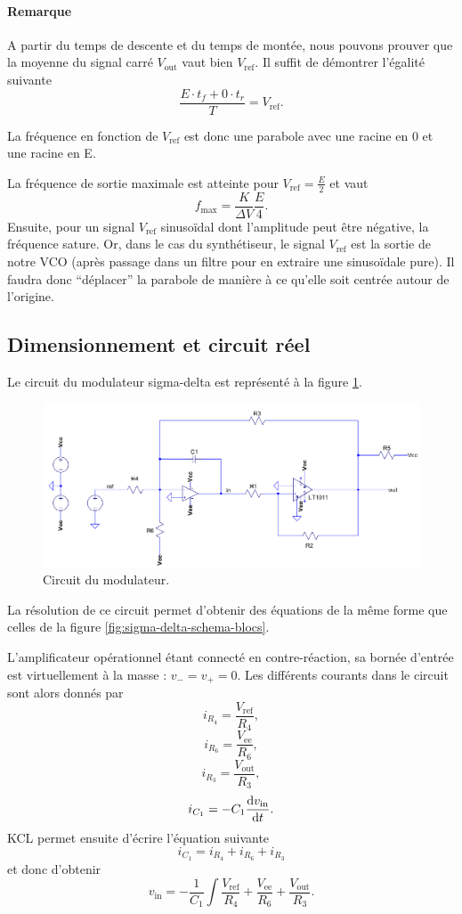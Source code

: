 \paragraph{Remarque}
A partir du temps de descente et du temps de montée, nous
pouvons prouver que la moyenne du signal carré $V_{\text{out}}$
vaut bien $V_{\text{ref}}$. Il suffit de démontrer l'égalité
suivante
\[ \frac{E \cdot t_f + 0 \cdot t_r}{T} = V_{\text{ref}}.\]

La fréquence en fonction de $V_{\text{ref}}$ est donc
une parabole avec une racine en \unit{0}{\volt} et une
racine en \unit{E}{\volt}.

La fréquence de sortie maximale est atteinte pour 
$V_{\text{ref}} = \frac{E}{2}$ et vaut
\[ f_{\text{max}} = \frac{K}{\Delta V}\frac{E}{4}. \]
Ensuite, pour un signal $V_{\text{ref}}$ sinusoïdal dont
l'amplitude peut être négative, la fréquence sature.
Or, dans le cas du synthétiseur, le signal $V_{\text{ref}}$
est la sortie de notre VCO (après passage dans un filtre pour
en extraire une sinusoïdale pure).
Il faudra donc ``déplacer'' la parabole de manière à ce qu'elle soit
centrée autour de l'origine.

\subsection{Dimensionnement et circuit réel}
Le circuit du modulateur sigma-delta est représenté
à la figure \ref{fig:sigma-delta-circuit}.

\begin{figure}[ht]
	\centering
	\includegraphics[scale=0.7]{img-sigma-delta/sigma-delta-circuit.png}
	\caption{Circuit du modulateur.}
	\label{fig:sigma-delta-circuit}
\end{figure}

La résolution de ce circuit permet d'obtenir des équations
de la même forme que celles de la figure
\ref{fig:sigma-delta-schema-blocs}.

L'amplificateur opérationnel étant connecté en contre-réaction,
sa bornée d'entrée est virtuellement à la masse : $v_- = v_+ = 0$.
Les différents courants dans le circuit sont alors donnés par
\[ i_{R_4} = \frac{V_{\text{ref}}}{R_4},\]
\[ i_{R_6} = \frac{V_{\text{ee}}}{R_6},\]
\[ i_{R_3} = \frac{V_{\text{out}}}{R_3},\]
\[ i_{C_1} = -C_1\frac{\operatorname{d}\! v_{\text{in}}}{\operatorname{d}\! t}.\]
KCL permet ensuite d'écrire l'équation suivante
\[ i_{C_1} = i_{R_4} + i_{R_6} + i_{R_3}\]
et donc d'obtenir
\[ v_{\text{in}} = -\frac{1}{C_1}\int \frac{V_{\text{ref}}}{R_4}
+ \frac{V_{\text{ee}}}{R_6} + \frac{V_{\text{out}}}{R_3}.\]

